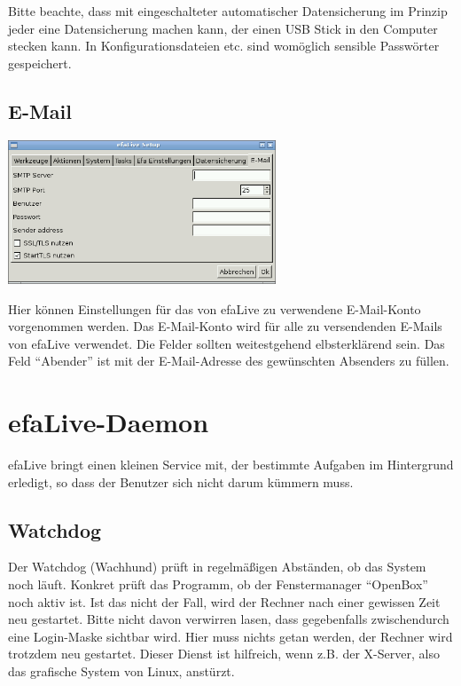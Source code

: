\documentclass[a4paper,12pt,twoside]{article}
\begin{document}
Bitte beachte, dass mit eingeschalteter automatischer Datensicherung im
Prinzip jeder eine Datensicherung machen kann, der einen USB Stick in
den Computer stecken kann. In Konfigurationsdateien etc. sind womöglich
sensible Passwörter gespeichert.


\subsection{E-Mail}
\label{sct:efalivesetup_email}

\bigskip
\begin{minipage}{\linewidth}
    \centering
    \captionsetup{type=figure}
    \includegraphics[width=8cm]{screenshots/efalive_setup_email.png}
    \label{fig:efalivesetup_email}
\end{minipage}
\bigskip

Hier können Einstellungen für das von efaLive zu verwendene E-Mail-Konto
vorgenommen werden. Das E-Mail-Konto wird für alle zu versendenden E-Mails
von efaLive verwendet. Die Felder sollten weitestgehend elbsterklärend sein.
Das Feld "`Abender"' ist mit der E-Mail-Adresse des gewünschten Absenders zu
füllen.


\section{efaLive-Daemon}
\label{sct:efalivedaemon}
efaLive bringt einen kleinen Service mit, der bestimmte
Aufgaben im Hintergrund erledigt, so dass der Benutzer sich nicht
darum kümmern muss.


\subsection{Watchdog}
\label{sct:watchdog}
Der Watchdog (Wachhund) prüft in regelmäßigen Abständen, ob das System
noch läuft. Konkret prüft das Programm, ob der Fenstermanager "`OpenBox"'
noch aktiv ist. Ist das nicht der Fall, wird der Rechner nach einer gewissen
Zeit neu gestartet. Bitte nicht davon verwirren lasen, dass gegebenfalls
zwischendurch eine Login-Maske sichtbar wird. Hier muss nichts getan werden,
der Rechner wird trotzdem neu gestartet.
Dieser Dienst ist hilfreich, wenn z.B. der X-Server, also das grafische
System von Linux, anstürzt.
\end{document}
